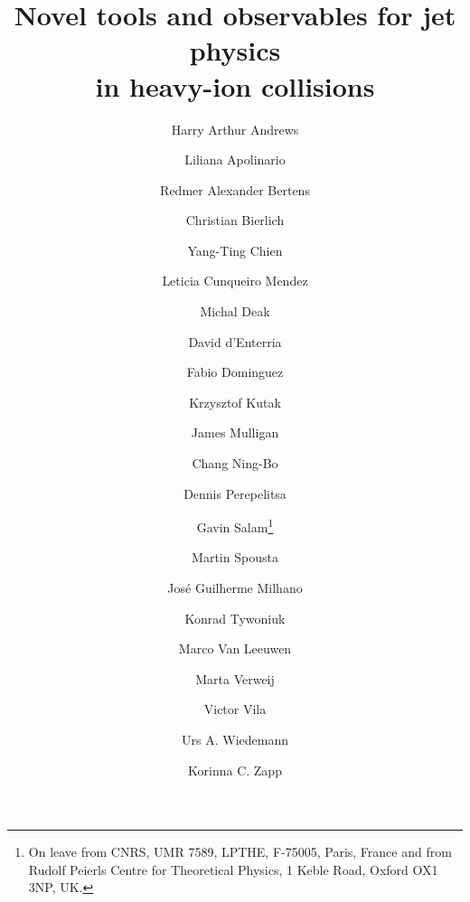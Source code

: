 \documentclass{article}
\begin{document}
\title{Novel tools and observables for jet physics \\ in heavy-ion collisions}
%
\author[bir]{Harry Arthur Andrews}
\author[lip,ist]{Liliana Apolinario}
\author[ten]{Redmer Alexander Bertens}
\author[lund,bohr]{Christian Bierlich}
\author[mit]{Yang-Ting Chien}
\author[oak,ten]{Leticia Cunqueiro Mendez}
\author[ifj]{Michal Deak}
\author[cern]{David d'Enterria}
\author[igf]{Fabio Dominguez}
\author[ifj]{Krzysztof Kutak}
\author[yal]{James Mulligan}
\author[itp]{Chang Ning-Bo}
\author[col]{Dennis Perepelitsa}
\author[cern]{Gavin Salam\footnote{On leave from CNRS, UMR 7589, LPTHE, F-75005, Paris, France and from Rudolf Peierls Centre for Theoretical Physics, 1 Keble Road, Oxford OX1 3NP, UK.}}
\author[char]{Martin Spousta}
\author[lip,ist,cern]{Jos\'e Guilherme Milhano}
\author[cern]{Konrad Tywoniuk}
\author[nik]{Marco Van Leeuwen}
\author[van]{Marta Verweij}
\author[igf]{Victor Vila}
\author[cern]{Urs A. Wiedemann}
\author[lip,cern]{Korinna C. Zapp}
%
\end{document}
